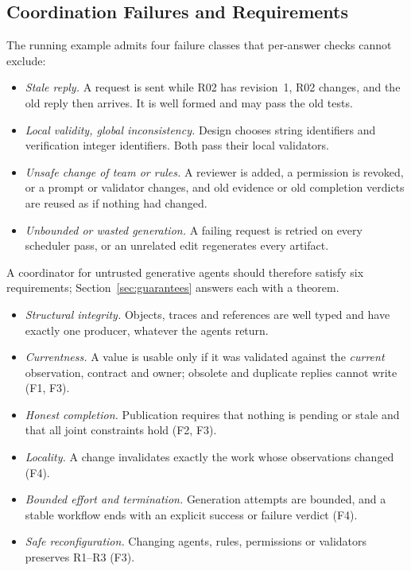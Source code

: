 \subsection{Coordination Failures and Requirements}\label{sec:failures}\label{sec:requirements}
The running example admits four failure classes that per-answer checks cannot exclude:
\begin{itemize}
\item[\textbf{F1}] \emph{Stale reply.} A request is sent while R02 has revision~1, R02 changes, and the old reply then arrives. It is well formed and may pass the old tests.
\item[\textbf{F2}] \emph{Local validity, global inconsistency.} Design chooses string identifiers and verification integer identifiers. Both pass their local validators.
\item[\textbf{F3}] \emph{Unsafe change of team or rules.} A reviewer is added, a permission is revoked, or a prompt or validator changes, and old evidence or old completion verdicts are reused as if nothing had changed.
\item[\textbf{F4}] \emph{Unbounded or wasted generation.} A failing request is retried on every scheduler pass, or an unrelated edit regenerates every artifact.
\end{itemize}
A coordinator for untrusted generative agents should therefore satisfy six requirements; Section~\ref{sec:guarantees} answers each with a theorem.
\begin{itemize}
\item[\textbf{R1}] \emph{Structural integrity.} Objects, traces and references are well typed and have exactly one producer, whatever the agents return.
\item[\textbf{R2}] \emph{Currentness.} A value is usable only if it was validated against the \emph{current} observation, contract and owner; obsolete and duplicate replies cannot write (F1, F3).
\item[\textbf{R3}] \emph{Honest completion.} Publication requires that nothing is pending or stale and that all joint constraints hold (F2, F3).
\item[\textbf{R4}] \emph{Locality.} A change invalidates exactly the work whose observations changed (F4).
\item[\textbf{R5}] \emph{Bounded effort and termination.} Generation attempts are bounded, and a stable workflow ends with an explicit success or failure verdict (F4).
\item[\textbf{R6}] \emph{Safe reconfiguration.} Changing agents, rules, permissions or validators preserves R1--R3 (F3).
\end{itemize}

